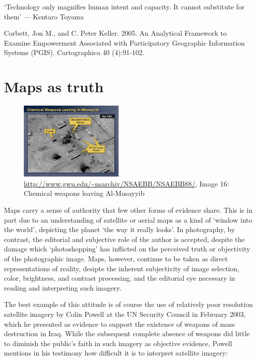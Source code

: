 \documentclass[11pt,oneside,notitlepage]{report}
\begin{document}
`Technology only magnifies human intent and capacity. It cannot substitute for them' --- Kentaro Toyama

Corbett, Jon M., and C. Peter Keller. 2005. An Analytical Framework to Examine Empowerment Associated with Participatory Geographic Information Systems (PGIS). Cartographica 40 (4):91-102.

\section{Maps as truth}
\label{sec:truth}

\begin{figure}
	\begin{flushright}
		\includegraphics[width=0.45\textwidth]{images/iraq-image-16.jpg}
		\caption{\url{http://www.gwu.edu/~nsarchiv/NSAEBB/NSAEBB88/}, Image 16: Chemical weapons leaving Al-Musayyib}
	\end{flushright}
\end{figure}

Maps carry a sense of authority that few other forms of evidence share. This is in part due to an understanding of satellite or aerial maps as a kind of `window into the world', depicting the planet `the way it really looks'. In photography, by contrast, the editorial and subjective role of the author is accepted, despite the damage which `photoshopping' has inflicted on the perceived truth or objectivity of the photographic image. Maps, however, continue to be taken as direct representations of reality, desipte the inherent subjectivity of image selection, color, brightness, and contrast processing, and the editorial eye necessary in reading and interpreting such imagery. 

The best example of this attitude is of course the use of relatively poor resolution satellite imagery by Colin Powell at the UN Security Council in February 2003, which he presented as evidence to support the existence of weapons of mass destruction in Iraq. While the subsequent complete absence of weapons did little to diminish the public's faith in such imagery as objective evidence, Powell mentions in his testimony how difficult it is to interpret satellite imagery:  
\end{document}
